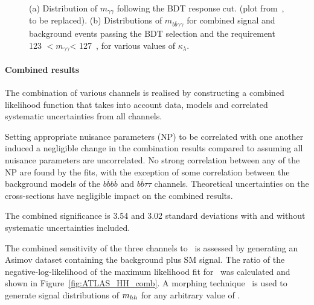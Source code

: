 

\begin{figure}[!htb]
\centering 
{} 
\caption{(a) Distribution of $m_{\gamma\gamma}$ following the BDT response cut. (plot from~\cite{ITKPixelTDR}, to be replaced). (b) Distributions of $m_{b\bar{b}\gamma\gamma}$ for combined signal and background events passing the BDT selection and the requirement 123 \UGeV$ < \ensuremath{m_{\gamma\gamma}} $< 127~\UGeV, for various values of $\kappa_{\lambda}$.} 
\label{fig:ATLAS_HH_bbyy} 
\end{figure}


%
\paragraph{Combined results}


The combination of various channels is realised by constructing a combined likelihood function that takes into account data, models and correlated systematic uncertainties from all channels. 

Setting appropriate nuisance parameters (NP) to be correlated with one another induced a negligible change in the combination results compared to assuming all nuisance parameters are uncorrelated. No strong correlation between any of the NP are found by the fits, with the exception of some correlation between the background models of the $b\bar{b}b\bar{b}$ and $b\bar{b}\tau\tau$ channels. Theoretical uncertainties on the cross-sections have negligible impact on the combined results.

The combined significance is 3.54 and 3.02 standard deviations with and without systematic uncertainties included.

The combined sensitivity of the three channels to \kl\ is assessed by generating an Asimov dataset containing the background plus SM signal. The ratio of the negative-log-likelihood of the maximum likelihood fit for \kl\ was calculated and shown in Figure~\ref{fig:ATLAS_HH_comb}. A morphing technique~\cite{ATL-PHYS-PUB-2015-047} is used to generate signal distributions of $m_{hh}$ for any arbitrary value of \kl.

